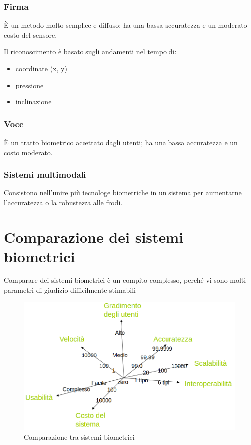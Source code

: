 \subsubsection{Firma}

È un metodo molto semplice e diffuso; ha una bassa accuratezza e un moderato costo del sensore.

Il riconoscimento è basato sugli andamenti nel tempo di:
\begin{itemize}
    \item coordinate (x, y)
    \item pressione
    \item inclinazione
\end{itemize}

\subsubsection{Voce}

È un tratto biometrico accettato dagli utenti; ha una bassa accuratezza e un costo moderato.

\subsubsection{Sistemi multimodali}

Consistono nell'unire più tecnologe biometriche in un sistema per aumentarne l'accuratezza o la robustezza alle frodi.

\newpage

\section{Comparazione dei sistemi biometrici}

Comparare dei sistemi biometrici è un compito complesso, perché vi sono molti parametri di giudizio difficilmente stimabili

\begin{figure}[h]
    \centering
    \includegraphics[width=0.95\linewidth]{chapters/images-chap1/comparazione.png}
    \caption{Comparazione tra sistemi biometrici}
    \label{fig:comparazione}
\end{figure}

